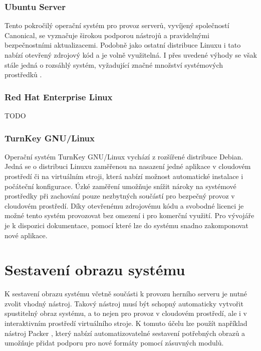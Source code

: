 \subsubsection{Ubuntu Server}

Tento pokročilý operační systém pro provoz serverů, vyvíjený společností Canonical, se vyznačuje širokou podporou nástrojů a pravidelnými bezpečnostními
aktualizacemi. Podobně jako ostatní distribuce Linuxu i tato nabízí otevřený zdrojový kód a je volně využitelná. I přes uvedené výhody se však stále jedná o
rozsáhlý systém, vyžadující značné množství systémových prostředků \cite{ubuntu_server_reqs}.

\subsubsection{Red Hat Enterprise Linux}

TODO

\subsubsection{TurnKey GNU/Linux}

Operační systém TurnKey GNU/Linux vychází z rozšířené distribuce Debian. Jedná se o distribuci Linuxu zaměřenou na nasazení jedné aplikace v cloudovém prostředí
či na virtuálním stroji, která nabízí možnost automatické instalace i počáteční konfigurace. Úzké zaměření umožňuje snížit nároky na systémové prostředky
při zachování pouze nezbytných součástí pro bezpečný provoz v cloudovém prostředí. Díky otevřenému zdrojovému kódu a svobodné licenci je možné
tento systém provozovat bez omezení i pro komerční využití. Pro vývojáře je k dispozici dokumentace, pomocí které lze do systému snadno zakomponovat
nové aplikace.

\section{Sestavení obrazu systému}

K sestavení obrazu systému včetně součásti k provozu herního serveru je nutné zvolit vhodný nástroj. Takový nástroj
musí být schopný automaticky vytvořit spustitelný obraz systému, a to nejen pro provoz v cloudovém prostředí, ale i
v interaktivním prostředí virtuálního stroje. K tomuto účelu lze použít například nástroj Packer \cite{packer},
který nabízí automatizovatelné sestavení potřebných obrazů a umožňuje
přidat podporu pro nové formáty pomocí zásuvných modulů.

